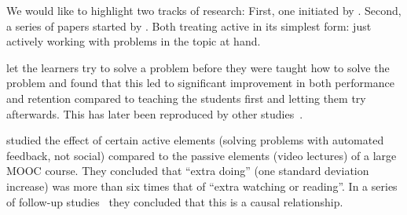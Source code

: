We would like to highlight two tracks of research:
First, one initiated by \textcite{Szekely1950}.
Second, a series of papers started by \textcite{koedinger2015}.
Both treating active in its simplest form: just actively working with problems 
in the topic at hand.

\Textcite{Szekely1950} let the learners try to solve a problem before they were 
taught how to solve the problem and found that this led to significant 
improvement in both performance and retention compared to teaching the students 
first and letting them try afterwards.
This has later been reproduced by other 
studies~\parencites{NecessaryConditionsOfLearning}[see for 
instance][]{BransfordSchwartz1999}.

\Textcite{koedinger2015} studied the effect of certain active elements (solving 
problems with automated feedback, not social) compared to the passive elements 
(video lectures) of a large MOOC course.
They concluded that \enquote{extra doing} (one standard deviation increase) was 
more than six times that of \enquote{extra watching or reading}.
In a series of follow-up 
studies~\parencite{koedinger2016doer,koedinger2018doer,van2021doer} they 
concluded that this is a causal relationship.
